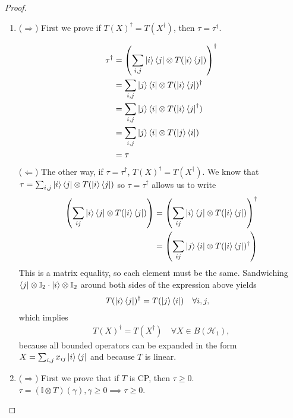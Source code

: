 \documentclass[../../note.tex]{subfiles}
\begin{document}
\begin{tcolorbox}[colframe=black,breakable, colback=black!5, arc=0pt, outer arc=0pt,boxrule=0.5pt]
\begin{proof}
\begin{enumerate}
    \item ($\Rightarrow$) First we prove if $T(X)^{\dagger}=T(X^{\dagger})$, then $\tau=\tau^{\dagger}$.
    
    \begin{align}
        \tau^{\dagger} &= \left(\sum_{i,j}\ket{i}\bra{j} \otimes T(\ket{i}\bra{j})\right)^{\dagger}\\
        &= \sum_{i,j}\ket{j}\bra{i} \otimes T(\ket{i}\bra{j})^{\dagger}\\
        &= \sum_{i,j}\ket{j}\bra{i} \otimes T(\ket{i}\bra{j}^{\dagger})\\
        &=\sum_{i,j}\ket{j}\bra{i} \otimes T(\ket{j}\bra{i})\\
        &= \tau
    \end{align}
    ($\Leftarrow$) The other way, if $\tau = \tau^{\dagger}$, $T(X)^{\dagger}=T(X^{\dagger})$.
    We know that $\tau = \sum_{i,j} \ket{i}\bra{j} \otimes T(\ket{i}\bra{j})$ so $\tau=\tau^{\dagger}$ allows us to write
    \begin{align}
        \left(\sum_{ij} \ket{i}\bra{j} \otimes T(\ket{i}\bra{j})\right)&=\left(\sum_{ij} \ket{i}\bra{j} \otimes T(\ket{i}\bra{j})\right)^{\dagger}\\
        &=\left(\sum_{ij} \ket{j}\bra{i} \otimes T(\ket{i}\bra{j})^{\dagger}\right)
    \end{align}
    This is a matrix equality, so each element must be the same. Sandwiching $\bra{j}\otimes \mathbb{I}_2 \cdot \ket{i}\otimes \mathbb{I}_2$ around both sides of the expression above yields
    \begin{align}
        T(\ket{i}\bra{j})^{\dagger} &= T(\ket{j}\bra{i}) \quad \forall i,j,
    \end{align}
    which implies
    \begin{align}
        T(X)^{\dagger} = T(X^{\dagger}) \quad \forall X\in B(\mathcal{H}_1),
    \end{align}
    because all bounded operators can be expanded in the form $X=\sum_{i,j} x_{ij} \ket{i}\bra{j}$ and because $T$ is linear. 
    
    \item ($\Rightarrow$) First we prove that if $T$ is CP, then $\tau\geq 0$.   $\tau = (\mathbb{I} \otimes T)(\gamma), \gamma \geq 0 \implies \tau \geq 0$.
    

\end{enumerate}
\end{proof}
\end{tcolorbox}
\end{document}
